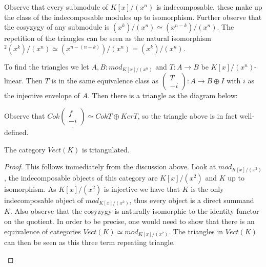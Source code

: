     Observe that every submodule of $K[x]/(x^n)$ is indecomposable, these make up the class of the indecomposable modules up to isomorphism. Further observe that the cosyzygy of any submodule is \upside{$\Omega$}$(x^k)/(x^n)\simeq (x^{n-k})/(x^n)$. The repetition of the triangles can be seen as the natural isomorphism \upside{$\Omega$}$^2(x^k)/(x^n)\simeq (x^{n-(n-k)})/(x^n) = (x^k)/(x^n)$.

    To find the triangles we let $A,B:mod_{K[x]/(x^n)}$ and $T:A\rightarrow B$ be $K[x]/(x^n)$-linear. Then $T$ is in the same equivalence class as $\begin{pmatrix} T \\ -i \end{pmatrix}:A\rightarrow B\oplus I$ with $i$ as the injective envelope of $A$. Then there is a triangle as the diagram below:

    \begin{center}
    \end{center}

    Observe that $Cok\underline{\begin{pmatrix} f \\ -i \end{pmatrix}} \simeq Cok\underline{T}\oplus Ker$\underline{\upside{$\Omega$}$T$}, so the triangle above is in fact well-defined.

    \begin{lemma}
        The category $Vect(K)$ is triangulated.
    \end{lemma}

    \begin{proof}
        This follows immediately from the discussion above. Look at $mod_{K[x]/(x^2)}$, the indecomposable objects of this category are $K[x]/(x^2)$ and $K$ up to isomorphism. As $K[x]/(x^2)$ is injective we have that $K$ is the only indecomposable object of \underline{$mod_{K[x]/(x^2)}$}, thus every object is a direct summand $K$. Also observe that the cosyzygy is naturally isomorphic to the identity functor on the quotient. In order to be precise, one would need to show that there is an equivalence of categories $Vect(K)\simeq mod_{K[x]/(x^2)}$. The triangles in $Vect(K)$ can then be seen as this three term repeating triangle.
        \begin{center}
        \end{center}
    \end{proof}

